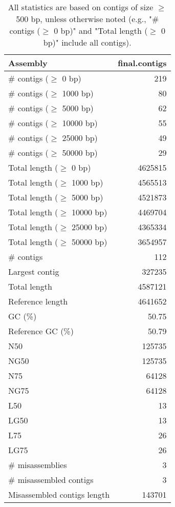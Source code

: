 \documentclass[12pt,a4paper]{article}
\begin{document}
\begin{table}[ht]
\begin{center}
\caption{All statistics are based on contigs of size $\geq$ 500 bp, unless otherwise noted (e.g., "\# contigs ($\geq$ 0 bp)" and "Total length ($\geq$ 0 bp)" include all contigs).}
\begin{tabular}{|l*{1}{|r}|}
\hline
Assembly & final.contigs \\ \hline
\# contigs ($\geq$ 0 bp) & 219 \\ \hline
\# contigs ($\geq$ 1000 bp) & 80 \\ \hline
\# contigs ($\geq$ 5000 bp) & 62 \\ \hline
\# contigs ($\geq$ 10000 bp) & 55 \\ \hline
\# contigs ($\geq$ 25000 bp) & 49 \\ \hline
\# contigs ($\geq$ 50000 bp) & 29 \\ \hline
Total length ($\geq$ 0 bp) & 4625815 \\ \hline
Total length ($\geq$ 1000 bp) & 4565513 \\ \hline
Total length ($\geq$ 5000 bp) & 4521873 \\ \hline
Total length ($\geq$ 10000 bp) & 4469704 \\ \hline
Total length ($\geq$ 25000 bp) & 4365334 \\ \hline
Total length ($\geq$ 50000 bp) & 3654957 \\ \hline
\# contigs & 112 \\ \hline
Largest contig & 327235 \\ \hline
Total length & 4587121 \\ \hline
Reference length & 4641652 \\ \hline
GC (\%) & 50.75 \\ \hline
Reference GC (\%) & 50.79 \\ \hline
N50 & 125735 \\ \hline
NG50 & 125735 \\ \hline
N75 & 64128 \\ \hline
NG75 & 64128 \\ \hline
L50 & 13 \\ \hline
LG50 & 13 \\ \hline
L75 & 26 \\ \hline
LG75 & 26 \\ \hline
\# misassemblies & 3 \\ \hline
\# misassembled contigs & 3 \\ \hline
Misassembled contigs length & 143701 \\ \hline

\end{tabular}
\end{center}
\end{table}
\end{document}

